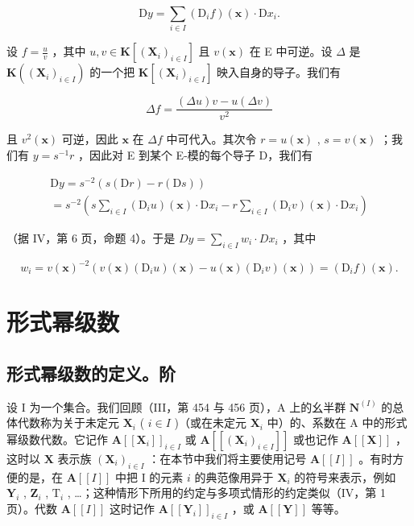 \[
\mathrm{D} y = \sum_ {i \in I} (\mathrm{D} _ {i} f) (\mathbf {x}) \cdot \mathrm{D} x _ {i}.
\]

设 \(f = \frac{u}{v}\) ，其中 \(u, v \in \mathbf{K}[(\mathbf{X}_i)_{i \in I}]\) 且 \(v(\mathbf{x})\) 在 E 中可逆。设 \(\Delta\) 是 \(\mathbf{K}((\mathbf{X}_i)_{i \in I})\) 的一个把 \(\mathbf{K}[(\mathbf{X}_i)_{i \in I}]\) 映入自身的导子。我们有

\[
\Delta f = \frac {(\Delta u) v - u (\Delta v)}{v ^ {2}}
\]

且 \(v^2(\mathbf{x})\) 可逆，因此 \(\mathbf{x}\) 在 \(\Delta f\) 中可代入。其次令 \(r = u(\mathbf{x})\) , \(s = v(\mathbf{x})\) ；我们有 \(y = s^{-1}r\) ，因此对 E 到某个 E-模的每个导子 D，我们有

\[
\begin{array}{l} \mathrm{D} y = s ^ {- 2} (s (\mathrm{D} r) - r (\mathrm{D} s)) \\ = s ^ {- 2} \left(s \sum_ {i \in I} (\mathrm{D} _ {i} u) (\mathbf {x}) \cdot \mathrm{D} x _ {i} - r \sum_ {i \in I} (\mathrm{D} _ {i} v) (\mathbf {x}) \cdot \mathrm{D} x _ {i}\right) \end{array}
\]

（据 IV，第 6 页，命题 4）。于是 \(Dy = \sum_{i \in I} w_i \cdot Dx_i\) ，其中

\[
w _ {i} = v (\mathbf {x}) ^ {- 2} (v (\mathbf {x}) \left(\mathrm{D} _ {i} u\right) (\mathbf {x}) - u (\mathbf {x}) \left(\mathrm{D} _ {i} v\right) (\mathbf {x})) = \left(\mathrm{D} _ {i} f\right) (\mathbf {x}).
\]

\section{形式幂级数}

\subsection{形式幂级数的定义。阶}

设 I 为一个集合。我们回顾（III，第 454 与 456 页），A 上的幺半群 \(\mathbf{N}^{(I)}\) 的总体代数称为关于未定元 \(\mathbf{X}_i\) ( \(i \in I\) )（或在未定元 \(\mathbf{X}_i\) 中）的、系数在 A 中的形式幂级数代数。它记作 \(\mathbf{A}[[\mathbf{X}_i]]_{i \in I}\) 或 \(\mathbf{A}[[(\mathbf{X}_i)_{i \in I}]]\) 或也记作 \(\mathbf{A}[[\mathbf{X}]]\) ，这时以 \(\mathbf{X}\) 表示族 \((\mathbf{X}_i)_{i \in I}\) ：在本节中我们将主要使用记号 \(\mathbf{A}[[I]]\) 。有时方便的是，在 \(\mathbf{A}[[I]]\) 中把 I 的元素 \(i\) 的典范像用异于 \(\mathbf{X}_i\) 的符号来表示，例如 \(\mathbf{Y}_i\) , \(\mathbf{Z}_i\) , \(\mathrm{T}_i\) , \ldots；这种情形下所用的约定与多项式情形的约定类似（IV，第 1 页）。代数 \(\mathbf{A}[[I]]\) 这时记作 \(\mathbf{A}[[\mathbf{Y}_i]]_{i \in I}\) ，或 \(\mathbf{A}[[\mathbf{Y}]]\) 等等。

